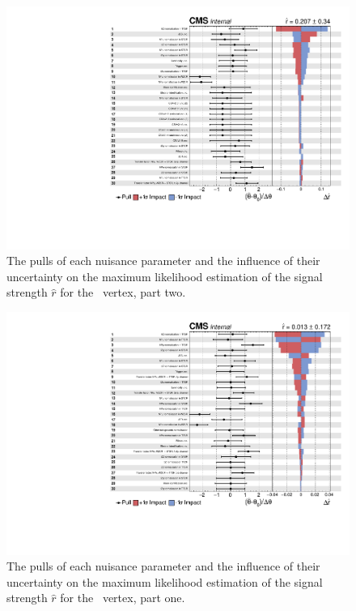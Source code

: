 \begin{figure}[htbp] 
	\centering
	\includegraphics[page=2,width=.99\linewidth,keepaspectratio]{6_Search/Figures/impact/171102Zut.pdf}
	\caption{The pulls of each nuisance parameter and the influence of their uncertainty on the maximum likelihood estimation of the signal strength $\hat{r}$ for the \Zut\ vertex, part two.}
	\label{fig:impactsZut}
\end{figure}

\newpage

\begin{figure}[htbp] 
	\centering
	\includegraphics[page=1,width=.99\linewidth,keepaspectratio]{6_Search/Figures/impact/171102Zct.pdf}
	\caption{The pulls of each nuisance parameter and the influence of their uncertainty on the maximum likelihood estimation of the signal strength $\hat{r}$ for the \Zct\ vertex, part one.}
	\label{fig:impactsZct11}
\end{figure}

